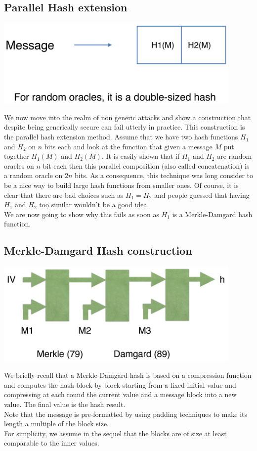 	\subsection{Parallel Hash extension}
		\begin{center}
			\includegraphics[width=120mm]{Graphics/Hash Functions/hf18.png}
		\end{center}
		We now move into the realm of non generic attacks and show a construction that despite being generically secure can fail utterly in practice. 
		This construction is the parallel hash extension method. 
		Assume that we have two hash functions $H_1$ and $H_2$ on $n$ bits each and look at the function that given a message $M$ put together $H_1(M)$ and $H_2(M)$. 
		It is easily shown that if $H_1$ and $H_2$ are random oracles on $n$ bit each then this parallel composition (also called concatenation) is a random oracle on $2n$ bits. 
		As a consequence, this technique was long consider to be a nice way to build large hash functions from smaller ones. 
		Of course, it is clear that there are bad choices such as $H_1 = H_2$ and people guessed that having $H_1$ and $H_2$ too similar wouldn’t be a good idea.\\
		We are now going to show why this fails as soon as $H_1$ is a Merkle-Damgard hash function.
		
	\subsection{Merkle-Damgard Hash construction}
		\begin{center}
			\includegraphics[width=120mm]{Graphics/Hash Functions/hf19.png}
		\end{center}
		We briefly recall that a Merkle-Damgard hash is based on a compression function and computes the hash block by block starting 
		from a fixed initial value and compressing at each round the current value and a message block into a new value. 
		The final value is the hash result.\\
		Note that the message is pre-formatted by using padding techniques to make its length a multiple of the block size.\\
		For simplicity, we assume in the sequel that the blocks are of size at least comparable to the inner values.
	
